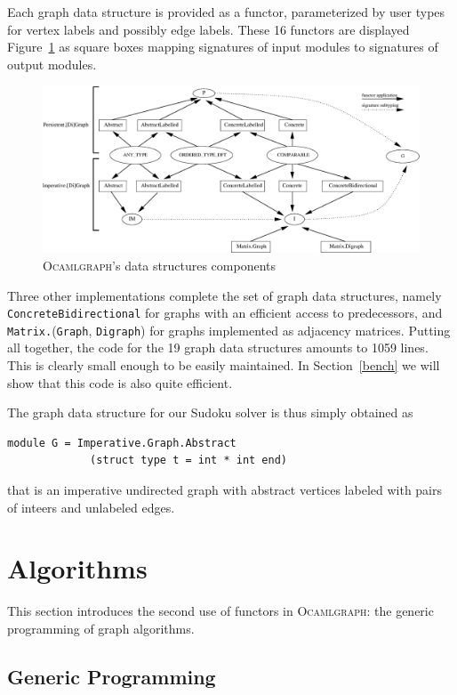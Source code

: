 \documentclass[]{tfp05symp}
\newcommand{\ocamlgraph}{\textsc{Ocamlgraph}\xspace}
\begin{document}
Each graph data structure is provided as a
functor, parameterized by user types for vertex labels and possibly edge
labels. These 16 
functors are displayed Figure~\ref{fig:interfaces} as square boxes
mapping signatures of input modules to signatures of output modules.
\begin{figure}
  \centering
  \includegraphics[width=\textwidth]{interface.eps} 
  \caption{\ocamlgraph's data structures components}\label{fig:interfaces}
\end{figure}
Three other implementations complete the set of graph data structures,
namely \texttt{ConcreteBidirectional} for graphs with an efficient
access to predecessors, and
\texttt{Matrix.}(\texttt{Graph}, \texttt{Digraph}) for graphs
implemented as adjacency matrices.
Putting all together, the code for the 19 graph data structures amounts
to 1059 lines. This is clearly small enough to be easily
maintained. In Section~\ref{bench} we will show that this code is also
quite efficient.

The graph data structure for our Sudoku solver is thus simply obtained as
\begin{verbatim}
module G = Imperative.Graph.Abstract
             (struct type t = int * int end) 
\end{verbatim}
that is an imperative undirected graph with abstract vertices labeled
with pairs of inteers and unlabeled edges.

\section{Algorithms}\label{algos}

This section introduces the second use of functors in \ocamlgraph: the
generic programming of graph algorithms.

\subsection{Generic Programming}
\end{document}
